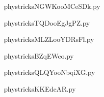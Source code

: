     \newcommand{\CaptionFigNGWKooMCeSDk}{<+Type your caption here+>}
    \begin{center}
        
    \end{center}
    phystricksNGWKooMCeSDk.py

    

    \clearpage
    


    \newcommand{\CaptionFigTQDooEgJgPZ}{<+Type your caption here+>}
    \begin{center}
        
    \end{center}
    phystricksTQDooEgJgPZ.py

    

    \clearpage
    


    \newcommand{\CaptionFigMLZLooYDRsFl}{<+Type your caption here+>}
    \begin{center}
        
    \end{center}
    phystricksMLZLooYDRsFl.py

    

    \clearpage
    


    \newcommand{\CaptionFigBZqEWco}{<+Type your caption here+>}
    \begin{center}
        
    \end{center}
    phystricksBZqEWco.py

    

    \clearpage
    


    \newcommand{\CaptionFigQLQYooNbqiXG}{<+Type your caption here+>}
    \begin{center}
        
    \end{center}
    phystricksQLQYooNbqiXG.py

    

    \clearpage
    


    \newcommand{\CaptionFigKKEdcAR}{<+Type your caption here+>}
    \begin{center}
        
    \end{center}
    phystricksKKEdcAR.py


